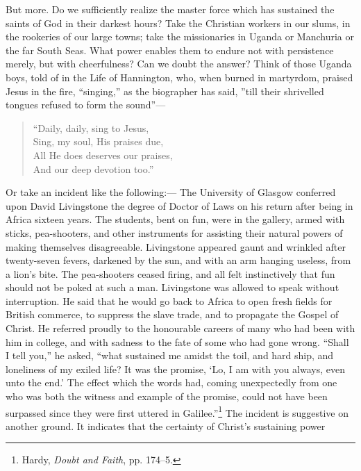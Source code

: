 \documentclass[12pt,a5paper,oneside]{book}
\begin{document}
But more. Do we sufficiently realize the
master force which has sustained the saints of
God in their darkest hours? Take the Christian
workers in our slums, in the rookeries of our
large towns; take the missionaries in Uganda or
Manchuria or the far South Seas. What power
enables them to endure not with persistence
merely, but with cheerfulness? Can we doubt
the answer? Think of those Uganda boys,
told of in the Life of Hannington, who, when
burned in martyrdom, praised Jesus in the
fire, ``singing,'' as the biographer has said,
''till their shrivelled tongues refused to form
the sound''---
\begin{verse}
\small
``Daily, daily, sing to Jesus,\\
\hspace{1em}Sing, my soul, His praises due,\\
All He does deserves our praises,\\
\hspace{1em}And our deep devotion too.''
\end{verse}
Or take an incident like the following:---
The University of Glasgow conferred upon
David Livingstone the degree of Doctor of
Laws on his return after being in Africa sixteen 
years. The students, bent on fun, were
in the gallery, armed with sticks, pea-shooters,
and other instruments for assisting their natural
powers of making themselves disagreeable.
Livingstone appeared gaunt and wrinkled after
twenty-seven fevers, darkened by the sun, and
with an arm hanging useless, from a lion's
bite. The pea-shooters ceased firing, and all
felt instinctively that fun should not be poked
at such a man. Livingstone was allowed to
speak without interruption. He said that he
would go back to Africa to open fresh fields for
British commerce, to suppress the slave trade,
and to propagate the Gospel of Christ. He
referred proudly to the honourable careers of
many who had been with him in college, and
with sadness to the fate of some who had
gone wrong. ``Shall I tell you,'' he asked,
``what sustained me amidst the toil, and hard
ship, and loneliness of my exiled life? It was
the promise, `Lo, I am with you always, even
unto the end.' The effect which the words
had, coming unexpectedly from one who was
both the witness and example of the promise,
could not have been surpassed since they were
first uttered in Galilee.''\footnote{Hardy, \textit{Doubt and Faith}, pp. 174--5.} 
The incident is
suggestive on another ground. It indicates
that the certainty of Christ's sustaining power
\end{document}
